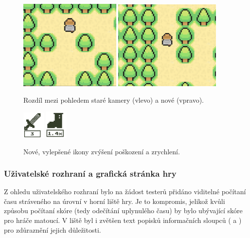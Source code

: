\begin{figure}[hb]
    \centering
    \includegraphics[width=0.45\textwidth]{obrazky-figures/ch5/old_camera.png}\hspace{0.5cm}
    \includegraphics[width=0.474\textwidth]{obrazky-figures/ch5/new_camera.png}
    \caption{Rozdíl mezi pohledem staré kamery (vlevo) a nové (vpravo).}
    \label{fig:rozdil_kamer}
\end{figure}

\begin{figure}[ht]
    \centering
    \includegraphics[width=0.1\textwidth]{obrazky-figures/ch5/new_demage.png}\hspace{3cm}
    \includegraphics[width=0.1\textwidth]{obrazky-figures/ch5/new_speed.png}
    \caption{Nové, vylepšené ikony zvýšení poškození a zrychlení.}
    \label{fig:new_icons}
\end{figure}


\subsubsection*{\textbullet Uživatelské rozhraní a grafická stránka hry}
Z ohledu uživatelského rozhraní bylo na žádost testerů přidáno viditelné počítaní času stráveného na úrovní v horní liště hry. Je to kompromis, jelikož kvůli způsobu počítaní skóre (tedy odečítání uplynulého času) by bylo ubývající skóre pro hráče matoucí. V liště byl i zvětšen text popisků informačních sloupců ( a ) pro zdůraznění jejich důležitosti.

